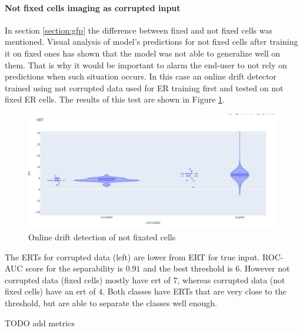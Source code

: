             \paragraph{Not fixed cells imaging as corrupted input}
                In section \ref{section:gfp} the difference between fixed and not fixed cells was mentioned. Visual analysis of model's predictions for not fixed cells after training it on fixed ones has shown that the model was not able to generalize well on them. That is why it would be important to alarm the end-user to not rely on predictions when such situation occurs. In this case an online drift detector trained using not corrupted data used for ER training first and tested on not fixed ER cells. The results of this test are shown in Figure \ref{fig:online-drift-not-fixed}.
                \begin{figure}[H]
                    \begin{center}
                        \includegraphics[width=0.5\linewidth]{bilder/drift-detection/online-fixed-vs-not-fixed.jpg}
                        \caption{Online drift detection of not fixated cells}\label{fig:online-drift-not-fixed}
                    \end{center}
                \end{figure}
                The ERTs for corrupted data (left) are lower from ERT for true input. ROC-AUC score for the separability is $0.91$ and the best threshold is $6$. However not corrupted data (fixed cells) mostly have ert of $7$, whereas corrupted data (not fixed cells) have an ert of $4$. Both classes have ERTs that are very close to the threshold, but are able to separate the classes well enough.

                TODO add metrics